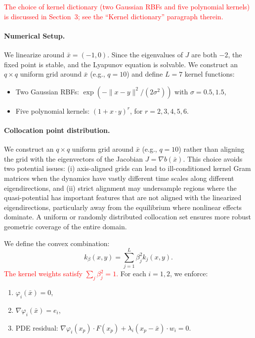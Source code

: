 \documentclass[11pt]{article}
\theoremstyle{plain}      %
\theoremstyle{definition} %
\begin{document}
\textcolor{red}{The choice of kernel dictionary (two Gaussian RBFs and five polynomial kernels) is discussed in Section~3; see the ``Kernel dictionary'' paragraph therein.}

\paragraph{Numerical Setup.}
We linearize around \( \bar x = (-1, 0) \). Since the eigenvalues of \( J \) are both \( -2 \), the fixed point is stable, and the Lyapunov equation is solvable. We construct an \( q \times q \) uniform grid around \( \bar{x} \) (e.g., \( q = 10 \)) and define \( L = 7 \) kernel functions:
\begin{itemize}
  \item Two Gaussian RBFs: \( \exp(-\|x - y\|^2 / (2\sigma^2)) \) with \( \sigma = 0.5, 1.5 \),
  \item Five polynomial kernels: \( (1 + x \cdot y)^r \), for \( r = 2, 3, 4, 5, 6 \).
\end{itemize}



\paragraph{Collocation point distribution.}
We construct an $q \times q$ uniform grid around $\bar{x}$ (e.g., $q=10$) rather than aligning the grid with the eigenvectors of the Jacobian $J = \nabla b(\bar{x})$. This choice avoids two potential issues: (i) axis-aligned grids can lead to ill-conditioned kernel Gram matrices when the dynamics have vastly different time scales along different eigendirections, and (ii) strict alignment may undersample regions where the quasi-potential has important features that are not aligned with the linearized eigendirections, particularly away from the equilibrium where nonlinear effects dominate. A uniform or randomly distributed collocation set ensures more robust geometric coverage of the entire domain.


We define the convex combination:
\[
k_\beta(x, y) = \sum_{j=1}^L \beta_j^2 k_j(x, y).
\]
\textcolor{red}{The kernel weights satisfy $\sum_j \beta_j^2 = 1$.}
For each \( i = 1, 2 \), we enforce:
\begin{enumerate}
  \item \( \varphi_i(\bar x) = 0 \),
  \item \( \nabla \varphi_i(\bar x) = e_i \),
  \item PDE residual: \( \nabla \varphi_i(x_p) \cdot F(x_p) + \lambda_i (x_p - \bar x) \cdot w_i = 0 \).
\end{enumerate}
\end{document}
